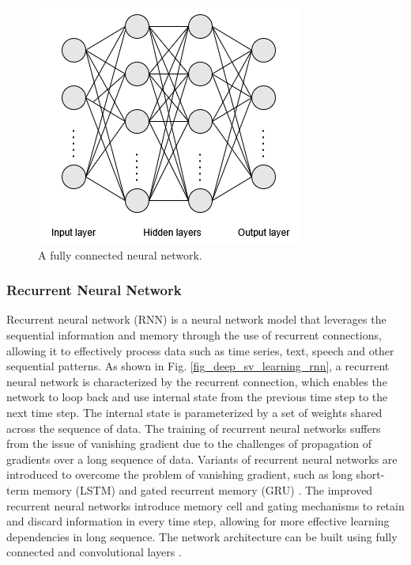 \documentclass[preprint,12pt]{elsarticle}
\begin{document}
\begin{figure}[h!]
    \centering
    \includegraphics[scale=0.6]{fig_deep_sv_learning_mlp.png}
    \caption{A fully connected neural network.}
    \label{fig_deep_sv_learning_mlp}
\end{figure}

\subsubsection{Recurrent Neural Network} 
Recurrent neural network (RNN) is a neural network model that leverages the sequential information and memory through the use of recurrent connections, allowing it to effectively process data such as time series, text, speech and other sequential patterns. As shown in Fig. \ref{fig_deep_sv_learning_rnn}, a recurrent neural network is characterized by the recurrent connection, which enables the network to loop back and use internal state from the previous time step to the next time step. The internal state is parameterized by a set of weights shared across the sequence of data. The training of recurrent neural networks suffers from the issue of vanishing gradient due to the challenges of propagation of gradients over a long sequence of data. Variants of recurrent neural networks are introduced to overcome the problem of vanishing gradient, such as long short-term memory (LSTM) \citep{hochreiter_long_1997} and gated recurrent memory (GRU) \citep{cho_learning_2014}. The improved recurrent neural networks introduce memory cell and gating mechanisms to retain and discard information in every time step, allowing for more effective learning dependencies in long sequence. The network architecture can be built using fully connected and convolutional layers \citep{shi_convolutional_2015}.
\end{document}
